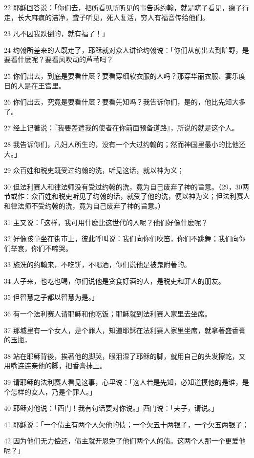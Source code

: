 \par 22 耶稣回答说：「你们去，把所看见所听见的事告诉约翰，就是瞎子看见，瘸子行走，长大麻疯的洁净，聋子听见，死人复活，穷人有福音传给他们。
\par 23 凡不因我跌倒的，就有福了！」
\par 24 约翰所差来的人既走了，耶稣就对众人讲论约翰说：「你们从前出去到旷野，是要看什麽呢？要看风吹动的芦苇吗？
\par 25 你们出去，到底是要看什麽？要看穿细软衣服的人吗？那穿华丽衣服、宴乐度日的人是在王宫里。
\par 26 你们出去，究竟是要看什麽？要看先知吗？我告诉你们，是的，他比先知大多了。
\par 27 经上记著说：『我要差遣我的使者在你前面预备道路』，所说的就是这个人。
\par 28 我告诉你们，凡妇人所生的，没有一个大过约翰的；然而神国里最小的比他还大。」
\par 29 众百姓和税吏既受过约翰的洗，听见这话，就以神为义；
\par 30 但法利赛人和律法师没有受过约翰的洗，竟为自己废弃了神的旨意。（29，30两节或作：众百姓和税吏听见了约翰的话，就受了他的洗，便以神为义；但法利赛人和律法师不受约翰的洗，竟为自己废弃了神的旨意。）
\par 31 主又说：「这样，我可用什麽比这世代的人呢？他们好像什麽呢？
\par 32 好像孩童坐在街市上，彼此呼叫说：我们向你们吹笛，你们不跳舞；我们向你们举哀，你们不啼哭。
\par 33 施洗的约翰来，不吃饼，不喝酒，你们说他是被鬼附著的。
\par 34 人子来，也吃也喝，你们说他是贪食好酒的人，是税吏和罪人的朋友。
\par 35 但智慧之子都以智慧为是。」
\par 36 有一个法利赛人请耶稣和他吃饭；耶稣就到法利赛人家里去坐席。
\par 37 那城里有一个女人，是个罪人，知道耶稣在法利赛人家里坐席，就拿著盛香膏的玉瓶，
\par 38 站在耶稣背後，挨著他的脚哭，眼泪湿了耶稣的脚，就用自己的头发擦乾，又用嘴连连亲他的脚，把香膏抹上。
\par 39 请耶稣的法利赛人看见这事，心里说：「这人若是先知，必知道摸他的是谁，是个怎样的女人，乃是个罪人。」
\par 40 耶稣对他说：「西门！我有句话要对你说。」西门说：「夫子，请说。」
\par 41 耶稣说：「一个债主有两个人欠他的债；一个欠五十两银子，一个欠五两银子；
\par 42 因为他们无力偿还，债主就开恩免了他们两个人的债。这两个人那一个更爱他呢？」
